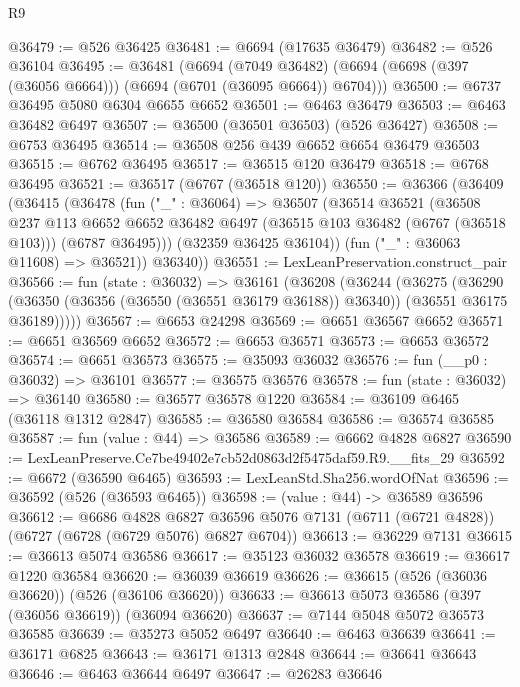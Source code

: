 \begin{lexlean}{R9}
\begin{coremodule}
@36479 := @526 @36425
@36481 := @6694 (@17635 @36479)
@36482 := @526 @36104
@36495 := @36481
    (@6694
      (@7049 @36482)
      (@6694 (@6698 (@397 (@36056 @6664))) (@6694 (@6701 (@36095 @6664)) @6704)))
@36500 := @6737 @36495 @5080 @6304 @6655 @6652
@36501 := @6463 @36479
@36503 := @6463 @36482 @6497
@36507 := @36500 (@36501 @36503) (@526 @36427)
@36508 := @6753 @36495
@36514 := @36508 @256 @439 @6652 @6654 @36479 @36503
@36515 := @6762 @36495
@36517 := @36515 @120 @36479
@36518 := @6768 @36495
@36521 := @36517 (@6767 (@36518 @120))
@36550 := @36366
    (@36409
      (@36415
        (@36478
          (fun ("_" : @36064) =>
          @36507
            (@36514
              @36521
              (@36508
                @237
                @113
                @6652
                @6652
                @36482
                @6497
                (@36515 @103 @36482 (@6767 (@36518 @103)))
                (@6787 @36495)))
            (@32359 @36425 @36104))
          (fun ("_" : @36063 @11608) => @36521))
        @36340))
@36551 := LexLeanPreservation.construct_pair
@36566 := fun (state : @36032) =>
  @36161
    (@36208
      (@36244
        (@36275
          (@36290
            (@36350 (@36356 (@36550 (@36551 @36179 @36188)) @36340))
            (@36551 @36175 @36189)))))
@36567 := @6653 @24298
@36569 := @6651 @36567 @6652
@36571 := @6651 @36569 @6652
@36572 := @6653 @36571
@36573 := @6653 @36572
@36574 := @6651 @36573
@36575 := @35093 @36032
@36576 := fun (__p0 : @36032) => @36101
@36577 := @36575 @36576
@36578 := fun (state : @36032) => @36140
@36580 := @36577 @36578 @1220
@36584 := @36109 @6465 (@36118 @1312 @2847)
@36585 := @36580 @36584
@36586 := @36574 @36585
@36587 := fun (value : @44) => @36586
@36589 := @6662 @4828 @6827
@36590 := LexLeanPreserve.Ce7be49402e7cb52d0863d2f5475daf59.R9.__fits_29
@36592 := @6672 (@36590 @6465)
@36593 := LexLeanStd.Sha256.wordOfNat
@36596 := @36592 (@526 (@36593 @6465))
@36598 := (value : @44) -> @36589 @36596
@36612 := @6686
    @4828
    @6827
    @36596
    @5076
    @7131
    (@6711 (@6721 @4828))
    (@6727 (@6728 (@6729 @5076) @6827 @6704))
@36613 := @36229 @7131
@36615 := @36613 @5074 @36586
@36617 := @35123 @36032 @36578
@36619 := @36617 @1220 @36584
@36620 := @36039 @36619
@36626 := @36615 (@526 (@36036 @36620)) (@526 (@36106 @36620))
@36633 := @36613 @5073 @36586 (@397 (@36056 @36619)) (@36094 @36620)
@36637 := @7144 @5048 @5072 @36573 @36585
@36639 := @35273 @5052 @6497
@36640 := @6463 @36639
@36641 := @36171 @6825
@36643 := @36171 @1313 @2848
@36644 := @36641 @36643
@36646 := @6463 @36644 @6497
@36647 := @26283 @36646

\end{coremodule}
\end{lexlean}
